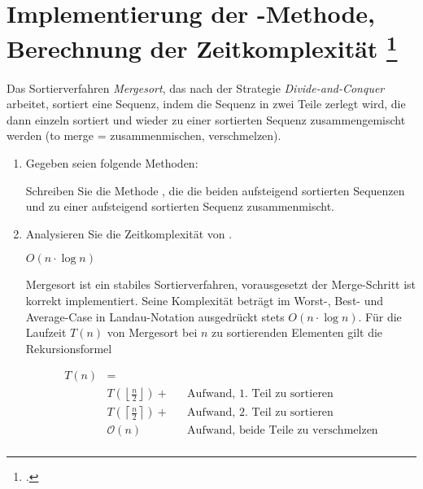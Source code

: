 \documentclass{lehramt-informatik-aufgabe}
\begin{document}

\section{Implementierung der -Methode, Berechnung der
Zeitkomplexität
\footcite[Seite 2, Aufgabe 3: Mergesort]{aud:ab:7}
}

Das Sortierverfahren \emph{Mergesort}, das nach der Strategie
\emph{Divide-and-Conquer} arbeitet, sortiert eine Sequenz, indem die
Sequenz in zwei Teile zerlegt wird, die dann einzeln sortiert und wieder
zu einer sortierten Sequenz zusammengemischt werden (to merge =
zusammenmischen, verschmelzen).

\begin{enumerate}


\item Gegeben seien folgende Methoden:


Schreiben Sie die Methode ,
die die beiden aufsteigend sortierten Sequenzen  und  zu
einer aufsteigend sortierten Sequenz zusammenmischt.

\begin{liAntwort}
\end{liAntwort}


\item Analysieren Sie die Zeitkomplexität von .

\begin{liAntwort}
$O(n \cdot \log n)$


Mergesort ist ein stabiles Sortierverfahren, vorausgesetzt der
Merge-Schritt ist korrekt implementiert. Seine Komplexität beträgt im
Worst-, Best- und Average-Case in Landau-Notation ausgedrückt stets $O(n
\cdot \log n)$. Für die Laufzeit $T(n)$ von Mergesort bei $n$ zu
sortierenden Elementen gilt die Rekursionsformel

\begin{align*}
T(n) & = \\
     & T\left(\left\lfloor\frac{n}{2}\right\rfloor\right) + && \text{Aufwand, 1. Teil zu sortieren}\\
     & T\left(\left\lceil\frac{n}{2}\right\rceil\right) + && \text{Aufwand, 2. Teil zu sortieren}\\
     & \mathcal{O}(n) && \text{Aufwand, beide Teile zu verschmelzen}\\
\end{align*}


\end{liAntwort}
\end{enumerate}
\end{document}
